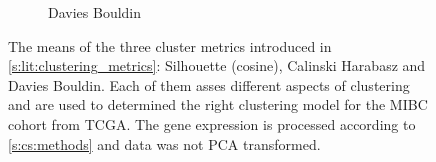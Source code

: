\begin{figure}[!h]
\begin{subfigure}[!t]{0.3\textwidth}
        \caption{Davies Bouldin}
        \label{fig:ap:dav_boul}
    \end{subfigure}
    \caption{The means of the three cluster metrics introduced in \cref{s:lit:clustering_metrics}: Silhouette (cosine), Calinski Harabasz and Davies Bouldin. Each of them asses different aspects of clustering and are used to determined the right clustering model for the MIBC cohort from TCGA. The gene expression is processed according to \cref{s:cs:methods} and data was not PCA transformed.}
    \label{fig:ap:non_pca_metrics}
\end{figure}



